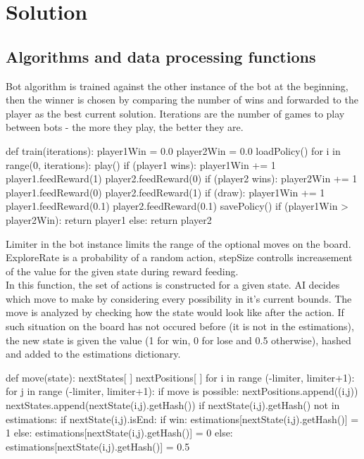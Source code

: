 \documentclass[a4paper,12pt]{book}
\begin{document}
	\chapter{Solution}
	\section{Algorithms and data processing functions}
Bot algorithm is trained against the other instance of the bot at the beginning, then the winner is chosen by comparing the number of wins and forwarded to the player as the best current solution. Iterations are the number of games to play between bots - the more they play, the better they are.
	
\begin{python}
def train(iterations):
	player1Win = 0.0
	player2Win = 0.0
	loadPolicy()
	for i in range(0, iterations):
		play()
		if (player1 wins):
			player1Win += 1
			player1.feedReward(1)
			player2.feedReward(0)
		if (player2 wins):
			player2Win += 1
			player1.feedReward(0)
			player2.feedReward(1)
		if (draw):
			player1Win += 1
			player1.feedReward(0.1)
			player2.feedReward(0.1)
	savePolicy()
	if (player1Win > player2Win):
		return player1
	else:
		return player2
\end{python}

Limiter in the bot instance limits the range of the optional moves on the board. ExploreRate is a probability of a random action, stepSize controlls increasement of the value for the given state during reward feeding. 
\\In this function, the set of actions is constructed for a given state. AI decides which move to make by considering every possibility in it's current bounds. The move is analyzed by checking how the state would look like after the action. If such situation on the board has not occured before (it is not in the estimations), the new state is given the value (1 for win, 0 for lose and 0.5 otherwise), hashed and added to the estimations dictionary.

\begin{python}
def move(state):
    nextStates[ ]
    nextPositions[ ]
      for i in range (-limiter, limiter+1):
        for j in range (-limiter, limiter+1):
          if move is possible:
            nextPositions.append((i,j))
            nextStates.append(nextState(i,j).getHash())
            if nextState(i,j).getHash() not in estimations:
            if nextState(i,j).isEnd:
              if win:
                estimations[nextState(i,j).getHash()] = 1
              else:
                estimations[nextState(i,j).getHash()] = 0
            else:
              estimations[nextState(i,j).getHash()] = 0.5
\end{python}
 
\end{document}
